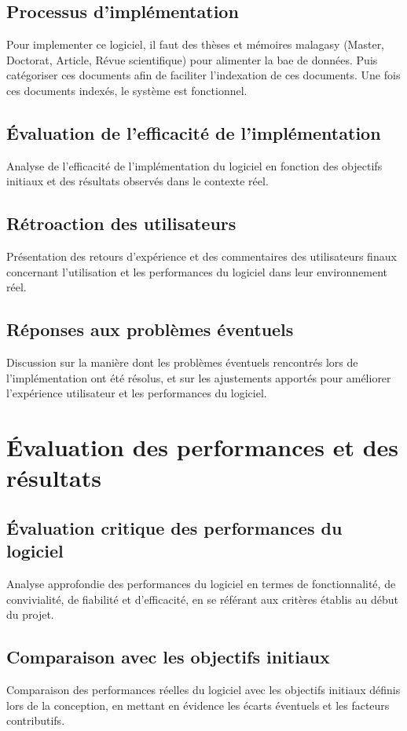 \subsection{Processus d'implémentation}
Pour implementer ce logiciel, il faut des thèses et mémoires malagasy (Master, Doctorat, Article, Révue scientifique) pour alimenter la bae de données. Puis catégoriser ces documents afin de faciliter l'indexation de ces documents. Une fois ces documents indexés, le système est fonctionnel.

\subsection{Évaluation de l'efficacité de l'implémentation}
Analyse de l'efficacité de l'implémentation du logiciel en fonction des objectifs initiaux et des résultats observés dans le contexte réel.

\subsection{Rétroaction des utilisateurs}
Présentation des retours d'expérience et des commentaires des utilisateurs finaux concernant l'utilisation et les performances du logiciel dans leur environnement réel.

\subsection{Réponses aux problèmes éventuels}
Discussion sur la manière dont les problèmes éventuels rencontrés lors de l'implémentation ont été résolus, et sur les ajustements apportés pour améliorer l'expérience utilisateur et les performances du logiciel.

\section{Évaluation des performances et des résultats}
\subsection{Évaluation critique des performances du logiciel}
Analyse approfondie des performances du logiciel en termes de fonctionnalité, de convivialité, de fiabilité et d'efficacité, en se référant aux critères établis au début du projet.

\subsection{Comparaison avec les objectifs initiaux}
Comparaison des performances réelles du logiciel avec les objectifs initiaux définis lors de la conception, en mettant en évidence les écarts éventuels et les facteurs contributifs.

